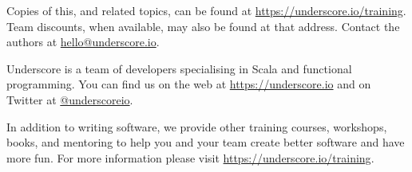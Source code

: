 \begin{center}

Copies of this, and related topics,
can be found at \href{https://underscore.io/training}{https://underscore.io/training}.
Team discounts, when available, may also be found at that address.
Contact the authors at \href{mailto:hello@underscore.io}{hello@underscore.io}.

\vspace{3em}

Underscore is a team of developers specialising in Scala and functional programming.
You can find us on the web at \href{https://underscore.io}{https://underscore.io}
and on Twitter at \href{https://twitter.com/underscoreio}{@underscoreio}.

In addition to writing software,
we provide other training courses, workshops, books, and mentoring
to help you and your team create better software and have more fun.
For more information please visit
\href{https://underscore.io/training}{https://underscore.io/training}.

\end{center}
